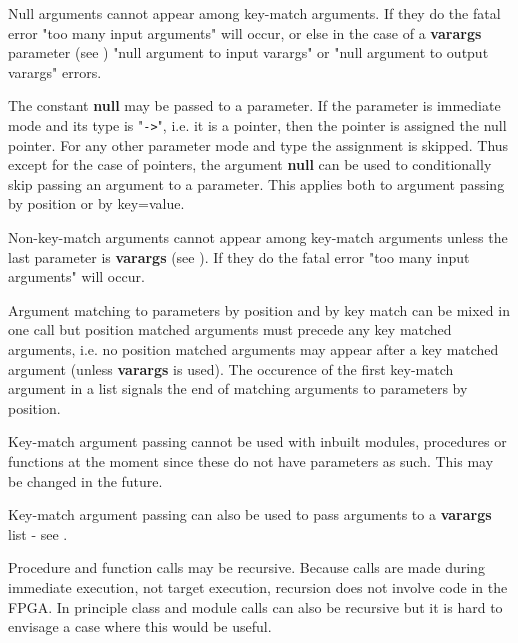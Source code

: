             Null arguments cannot appear among key-match arguments. If they do
            the fatal error "too many input arguments" will occur, or else in
            the case of a {\bf varargs} parameter (see )
            "null argument to input varargs" or "null argument to output
            varargs" errors.
            
            The constant {\bf null} may be passed to a parameter. If the
            parameter is immediate mode and its type is "\verb'->'", i.e. it is a
            pointer, then the pointer is assigned the null pointer. For
            any other parameter mode and type the assignment is skipped.
            Thus except for the case of pointers, the argument {\bf null}
            can be used to conditionally skip passing an argument to a
            parameter. This applies both to argument passing by position or
            by key=value.

            Non-key-match arguments cannot appear among key-match arguments unless
            the last parameter is {\bf varargs} (see
            ). If they do the fatal error "too many
            input arguments" will occur.
            
            Argument matching to parameters by position and by key match can be
            mixed in one call but position matched arguments must precede any
            key matched arguments, i.e. no position matched arguments may appear
            after a key matched argument (unless {\bf varargs} is used). The
            occurence of the first key-match argument in a list signals the end of
            matching arguments to parameters by position.
            
            Key-match argument passing cannot be used with inbuilt modules,
            procedures or functions at the moment since these do not have
            parameters as such. This may be changed in the future.
            
            Key-match argument passing  can also be used to pass arguments
            to a {\bf varargs} list - see .

            Procedure and function calls may be recursive.
            Because calls are made during immediate execution, not target
            execution, recursion does not involve code in the FPGA. In principle
            class and module calls can also be recursive but it is hard to
            envisage a case where this would be useful.

